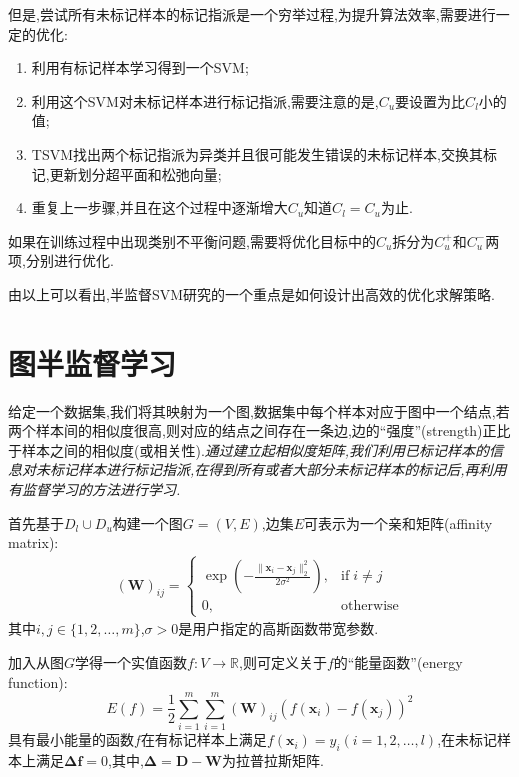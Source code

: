 但是,尝试所有未标记样本的标记指派是一个穷举过程,为提升算法效率,需要进行一定的优化:
\begin{enumerate}
\item 利用有标记样本学习得到一个SVM;
\item 利用这个SVM对未标记样本进行标记指派,需要注意的是,$C_u$要设置为比$C_l$小的值;
\item TSVM找出两个标记指派为异类并且很可能发生错误的未标记样本,交换其标记,更新划分超平面和松弛向量;
\item 重复上一步骤,并且在这个过程中逐渐增大$C_u$知道$C_l=C_u$为止.
\end{enumerate}

如果在训练过程中出现类别不平衡问题,需要将优化目标中的$C_u$拆分为$C_u^+$和$C_u^-$两项,分别进行优化.

由以上可以看出,半监督SVM研究的一个重点是如何设计出高效的优化求解策略.

\section{图半监督学习}

给定一个数据集,我们将其映射为一个图,数据集中每个样本对应于图中一个结点,若两个样本间的相似度很高,则对应的结点之间存在一条边,边的``强度''(strength)正比于样本之间的相似度(或相关性).\textit{通过建立起相似度矩阵,我们利用已标记样本的信息对未标记样本进行标记指派,在得到所有或者大部分未标记样本的标记后,再利用有监督学习的方法进行学习.}

首先基于$D_l\cup D_u$构建一个图$G=(V,E)$,边集$E$可表示为一个亲和矩阵(affinity matrix):
\begin{equation}\begin{split}
(\mathbf W)_{ij}=\begin{cases}
\exp(-\frac{\|\mathbf x_i-\mathbf x_j\|_2^2}{2\sigma^2}),&\text{if}\;i\ne j\\
0,&\text{otherwise}
\end{cases}\end{split}\end{equation}
其中$i,j\in\{1,2,\dots,m\}$,$\sigma>0$是用户指定的高斯函数带宽参数.

加入从图$G$学得一个实值函数$f:V\to\mathbb R$,则可定义关于$f$的``能量函数''(energy function):
\begin{equation}
E(f)=\frac{1}{2}\sum_{i=1}^m\sum_{i=1}^m(\mathbf W)_{ij}(f(\mathbf x_i)-f(\mathbf x_j))^2
\end{equation}
具有最小能量的函数$f$在有标记样本上满足$f(\mathbf x_i)=y_i(i=1,2,\dots,l)$,在未标记样本上满足$\mathbf\Delta\mathbf f=0$,其中,$\mathbf\Delta=\mathbf D-\mathbf W$为拉普拉斯矩阵.

